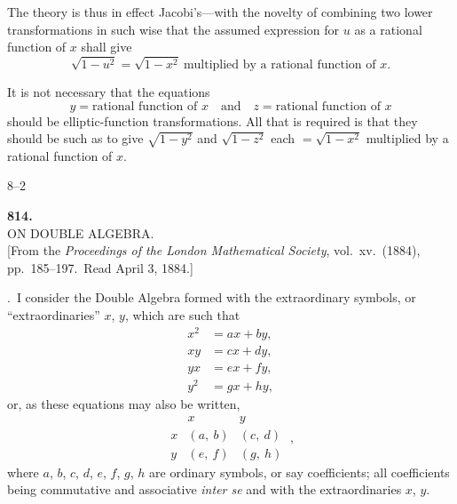 \documentclass[11pt,a4paper]{article}
\begin{document}
\medskip
The theory is thus in effect Jacobi's---with the novelty of combining two lower transformations in such wise that the assumed expression for $u$ as a rational function of $x$ shall give
\[
\sqrt{1 - u^{2}} = \sqrt{1 - x^{2}}\ \text{multiplied by a rational function of } x.
\]

\medskip
It is not necessary that the equations
\[
y = \text{rational function of } x\quad \text{and}\quad z = \text{rational function of } x
\]
should be elliptic-function transformations.  All that is required is that they should be such as to give $\sqrt{1 - y^{2}}$ and $\sqrt{1 - z^{2}}$ each $= \sqrt{1 - x^{2}}$ multiplied by a rational function of $x$.

\vfill
\noindent\hfill 8--2
\clearpage

\fancyhead[C]{\small\ }
\fancyhead[R]{\small [814}

\thispagestyle{plain}
\begin{center}
\vspace*{2em}
{\Large\bfseries 814.}\\[1.5em]
{\normalsize\scshape ON DOUBLE ALGEBRA.}\\[1em]
{\small [From the \textit{Proceedings of the London Mathematical Society}, vol.~xv.\ (1884), pp.~185--197.\ Read April 3, 1884.]}
\end{center}

\medskip
{}.\ I consider the Double Algebra formed with the extraordinary symbols, or ``extraordinaries'' $x$, $y$, which are such that
\[
\begin{aligned}
x^{2} &= ax + by,\\
xy    &= cx + dy,\\
yx    &= ex + fy,\\
y^{2} &= gx + hy,
\end{aligned}
\]
or, as these equations may also be written,
\[
\begin{array}{c|cc}
            & x       & y       \\\hline
x           & (a,\ b) & (c,\ d) \\
y           & (e,\ f) & (g,\ h)
\end{array}\ ,
\]
where $a$, $b$, $c$, $d$, $e$, $f$, $g$, $h$ are ordinary symbols, or say coefficients; all coefficients being commutative and associative \textit{inter se} and with the extraordinaries $x$, $y$.
\end{document}
